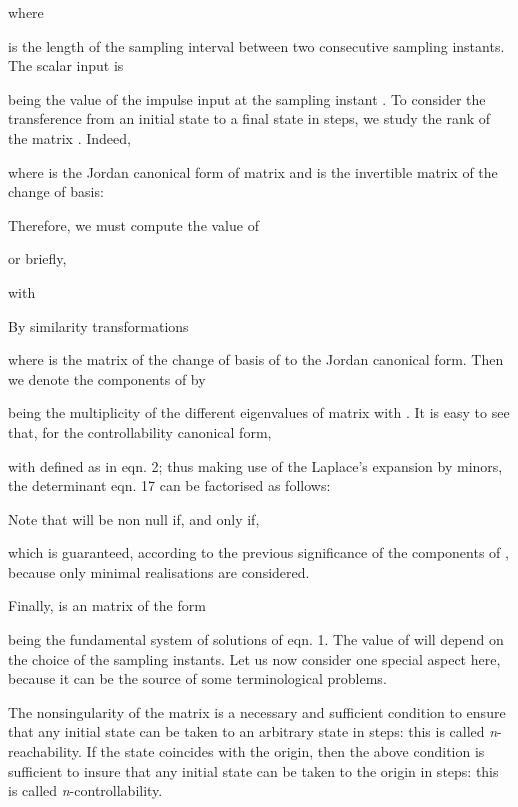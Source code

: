 \documentclass{article}
\begin{document}
where




is the length of the sampling interval between two consecutive
sampling instants. The scalar input is



 being the value of the impulse input at the sampling instant
. To consider the transference from an initial state to a
final state in  steps, we study the rank of the matrix
. Indeed,



where  is the Jordan canonical form of matrix  and  is
the invertible matrix of the change of basis:



Therefore, we must compute the value of



or briefly,



with



By similarity transformations


where  is the matrix of the change of basis of  to
the Jordan canonical form. Then we denote the components of 
by


 being the multiplicity of the 
different eigenvalues of matrix  with . It is easy to
see \cite{Kailath} that, for the controllability canonical form,



with  defined as in eqn. 2; thus making use of the Laplace's
expansion by minors, the determinant eqn. 17 can be factorised as
follows:






Note that  will be non null if, and only if,



which is guaranteed, according to the previous significance of the
components of , because only minimal realisations are
considered.

Finally,  is an  matrix of the form




 being the fundamental system of solutions of
eqn. 1. The value of  will depend on the
choice of the sampling instants. Let us now consider one special
aspect here, because it can be the source of some terminological
problems.

The nonsingularity of the matrix  is a
necessary and sufficient condition to ensure that any initial
state  can be taken to an arbitrary state  in  steps:
this is called \textit{n}-reachability. If the state 
coincides with the origin, then the above condition is sufficient
to insure that any initial state  can be taken to the origin
in  steps: this is called \textit{n}-controllability.
\end{document}
